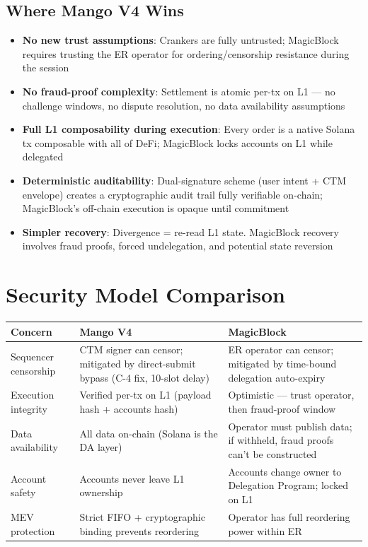\documentclass[11pt]{article}
\begin{document}
\subsection{Where Mango V4 Wins}

\begin{itemize}
  \item \textbf{No new trust assumptions}: Crankers are fully untrusted; MagicBlock requires trusting the ER operator for ordering/censorship resistance during the session
  \item \textbf{No fraud-proof complexity}: Settlement is atomic per-tx on L1 --- no challenge windows, no dispute resolution, no data availability assumptions
  \item \textbf{Full L1 composability during execution}: Every order is a native Solana tx composable with all of DeFi; MagicBlock locks accounts on L1 while delegated
  \item \textbf{Deterministic auditability}: Dual-signature scheme (user intent + CTM envelope) creates a cryptographic audit trail fully verifiable on-chain; MagicBlock's off-chain execution is opaque until commitment
  \item \textbf{Simpler recovery}: Divergence = re-read L1 state. MagicBlock recovery involves fraud proofs, forced undelegation, and potential state reversion
\end{itemize}

\section{Security Model Comparison}

\begin{longtable}{p{3cm}p{5.5cm}p{5.5cm}}
\toprule
\textbf{Concern} & \textbf{Mango V4} & \textbf{MagicBlock} \\
\midrule
Sequencer censorship & CTM signer can censor; mitigated by direct-submit bypass (C-4 fix, 10-slot delay) & ER operator can censor; mitigated by time-bound delegation auto-expiry \\
\midrule
Execution integrity & Verified per-tx on L1 (payload hash + accounts hash) & Optimistic --- trust operator, then fraud-proof window \\
\midrule
Data availability & All data on-chain (Solana is the DA layer) & Operator must publish data; if withheld, fraud proofs can't be constructed \\
\midrule
Account safety & Accounts never leave L1 ownership & Accounts change owner to Delegation Program; locked on L1 \\
\midrule
MEV protection & Strict FIFO + cryptographic binding prevents reordering & Operator has full reordering power within ER \\
\bottomrule
\end{longtable}
\end{document}
